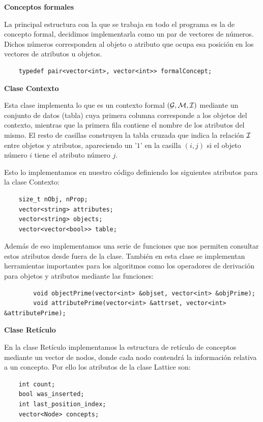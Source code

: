 \documentclass[oneside,openright,titlepage,numbers=noenddot,openany,headinclude,footinclude=true,
cleardoublepage=empty,abstractoff,BCOR=5mm,paper=a4,fontsize=12pt,main=spanish]{scrreprt}
\begin{document}
\textbf{Conceptos formales}

La principal estructura con la que se trabaja en todo el programa es la de concepto formal, decidimos implementarla como un par de vectores de números. Dichos números corresponden al objeto o atributo que ocupa esa posición en los vectores de atributos u objetos.

\begin{verbatim}
    typedef pair<vector<int>, vector<int>> formalConcept; 
\end{verbatim}

\textbf{Clase Contexto}

Esta clase implementa lo que es un contexto formal $(\mathcal{G},\mathcal{M},\mathcal{I})$ mediante un conjunto de datos (tabla) cuya primera columna corresponde a los objetos del contexto, mientras que la primera fila contiene el nombre de los atributos del mismo. El resto de casillas construyen la tabla cruzada que indica la relación $\mathcal{I}$ entre objetos y atributos, apareciendo un '$1$' en la casilla $(i,j)$ si el objeto número $i$ tiene el atributo número $j$. 

Esto lo implementamos en nuestro código definiendo los siguientes atributos para la clase Contexto:

\begin{verbatim}
    size_t nObj, nProp; 
    vector<string> attributes; 
    vector<string> objects; 
    vector<vector<bool>> table; 
\end{verbatim}

Además de eso implementamos una serie de funciones que nos permiten consultar estos atributos desde fuera de la clase. También en esta clase se implementan herramientas importantes para los algoritmos como los operadores de derivación para objetos y atributos mediante las funciones:  

\begin{verbatim}
        void objectPrime(vector<int> &objset, vector<int> &objPrime);
        void attributePrime(vector<int> &attrset, vector<int> &attributePrime);
\end{verbatim}


\textbf{Clase Retículo}

En la clase Retículo implementamos la estructura de retículo de conceptos mediante un vector de nodos, donde cada nodo contendrá la información relativa a un concepto. Por ello los atributos de la clase Lattice son:
\begin{verbatim}
    int count;
    bool was_inserted;
    int last_position_index;
    vector<Node> concepts; 
\end{verbatim}
\end{document}
